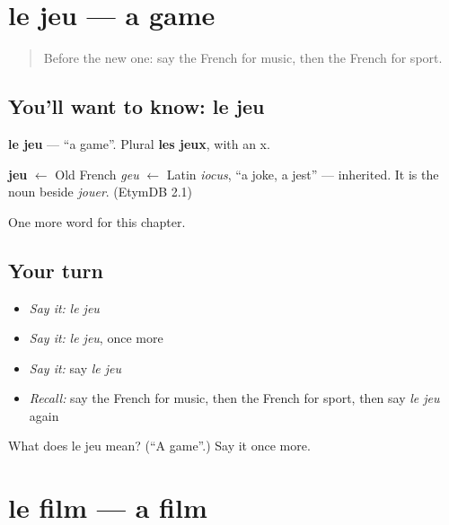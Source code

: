 \section[le jeu]{le jeu — a game}

\label{lesson:FR-C128-jeu}



\begin{quote}
Before the new one: say the French for music, then the French for sport.
\end{quote}

\subsection*{You'll want to know: le jeu}
\textbf{le jeu} — \textquotedblleft{}a game\textquotedblright{}. Plural \textbf{les jeux}, with an x.

\begin{cousinweb}
\textbf{jeu} $\leftarrow$ Old French \emph{geu} $\leftarrow$ Latin \emph{iocus}, \textquotedblleft{}a joke, a jest\textquotedblright{} — inherited. It is the noun beside \emph{jouer}. (EtymDB 2.1)
\end{cousinweb}

\begin{grammarlens}[title={What you've built}]
One more word for this chapter.
\end{grammarlens}

\subsection*{Your turn}
\begin{itemize}
\raggedright
  \item \emph{Say it:} \emph{le jeu}
  \item \emph{Say it:} \emph{le jeu}, once more
  \item \emph{Say it:} say \emph{le jeu}
  \item \emph{Recall:} say the French for music, then the French for sport, then say \emph{le jeu} again
\end{itemize}

\begin{tcolorbox}[breakable,colback=teal!4,colframe=teal!35!black,title={Before you move on}]
What does le jeu mean? (\textquotedblleft{}A game\textquotedblright{}.) Say it once more.
\end{tcolorbox}
\section[le film]{le film — a film}

